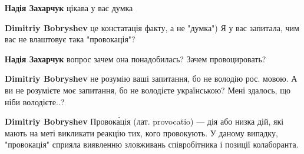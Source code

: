 \begin{itemize}
\begin{itemize}
 
\textbf{Надія Захарчук} цікава у вас думка

 
\textbf{Dimitriy Bobryshev} це констатація факту, а не "думка") Я у вас запитала, чим вас не влаштовує така "провокація"?

 
\textbf{Надія Захарчук} вопрос зачем она понадобилась? Зачем провоцировать?

 
\textbf{Dimitriy Bobryshev} не розумію ваші запитання, бо не володію рос. мовою. А ви не розумієте моє запитання, бо не володієте українською? Мені здалось, що ніби володієте..?

 
\textbf{Dimitriy Bobryshev} Провока́ція (лат. provocatio) — дія або низка дій, які мають на меті викликати реакцію тих, кого провокують. У даному випадку, "провокація" сприяла виявленню зловживань співробітника і позиції колаборанта.

 

\end{itemize}
\end{itemize}
